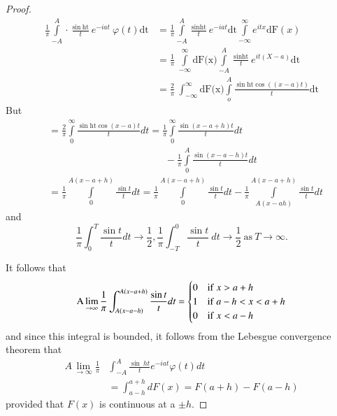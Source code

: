 \begin{proof}
  \begin{align*}
    \frac {1}{\pi} \int\limits^A_{-A} \cdot \frac{\sin ~\text{ht}}{t} e^{-iat}
    ~\varphi (t) \text{dt}
    &= \frac {1}{\pi} \int\limits^A_{-A} \frac{\sin \text{ht}}{t} e^{-iat}
    \text {dt} \int\limits^\infty _{-\infty} e^{itx} \text {dF}(x) \\ 
    &= \frac {1}{\pi} ~\int\limits^\infty _{-\infty} \text {dF(x)}
    \int\limits^A_{-A}  \frac{\sin \text{ht}}{t}  e^{it(X-a)} \text{dt}\\  
    &= \frac {2}{\pi} ~\int^\infty_{-\infty} \text{dF(x)}
    \int\limits^A_o \frac{\sin \text{ht} \cos ((x-a)t)}{t} \text{dt} 
  \end{align*}
  But
  \begin{align*}
    &= \frac {2}{\pi} \int\limits^\infty_0  \frac {\sin \text{ht} \cos
      (x-a)t}{t} dt 
    = \frac {1}{\pi} \int\limits^\infty _0 \frac{\sin(x-a+h)t}{t} dt\\ 
    &\hspace{5cm}-\frac{1}{\pi}  \int\limits^A_0 \frac {\sin (x-a-h)t}{t}dt\\
    &= \frac {1}{\pi}  \int\limits^{A(x-a+h)}_{0} \frac{\sin t}{t} dt = \frac
    {1}{\pi} \int\limits^{A(x-a+h)}_{0} \frac{\sin t}{t} dt - \frac {1}{\pi}
    \int\limits^{A(x-a+h)}_{A(x-ah)} \frac{\sin t}{t}dt 
  \end{align*}
  and\pageoriginale 
  $$ 
  \frac {1}{\pi} \int^{T}_{0} \frac{\sin t}{t} 
        {dt} \rightarrow \frac{1}{2}, \frac {1}{\pi} \int_{-T}^{0} \frac{\sin
          t}{t} ~dt \rightarrow \frac{1}{2} ~\text{as}~ T \rightarrow 
        \infty.
  $$ 

  It follows that 
  $$ 
  \text {A} \lim\limits_{\rightarrow \infty}  \frac {1}{\pi}
  \int^{A(x-a+h)}_{A(x-a-h)} \frac{\sin t}{t} dt =
  \begin{cases} 
    0 & {\rm if}~ x > a + h \\ 
    1 & {\rm if}~ a-h<x<a+h \\ 
    0 & {\rm if}~ x<a-h 
  \end{cases}
  $$
  and since this integral is bounded, it follows from the Lebesgue
  convergence theorem that 
  \begin{align*} 
    A \lim\limits_{\rightarrow \infty} \frac {1}{\pi} &
    \int^{A}_{-A} \frac{\sin~ht}{t} e^{-iat} \varphi(t)dt\\ 
    &= \int^{a+h}_{a-h} dF(x) = F(a+h) - F(a-h) 
  \end{align*}
  provided that $F(x)$ is continuous at a $\pm h$.
\end{proof}

